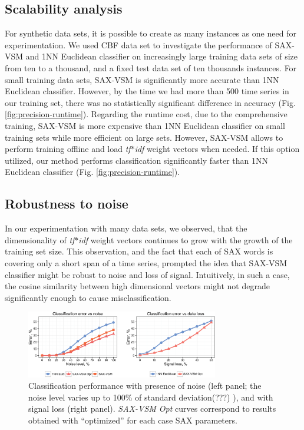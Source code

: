 \documentclass[conference]{IEEEtran}
\newcommand{\myfigureshrinkerless}{\vspace{-0.05cm}}
\begin{document}
\subsection{Scalability analysis}
For synthetic data sets, it is possible to create as many instances as one need for experimentation.
We used CBF data set \cite{cbf} to investigate the performance of SAX-VSM and 1NN Euclidean
classifier on increasingly large training data sets of size from ten to a thousand, and a fixed test
data set of ten thousands instances. For small training data sets, SAX-VSM is significantly more
accurate than 1NN Euclidean classifier. However, by the time we had more than 500 time series in
our training set, there was no statistically significant difference in accuracy (Fig.
\ref{fig:precision-runtime}). 
Regarding the runtime cost, due to the comprehensive training, SAX-VSM is more expensive than 
1NN Euclidean classifier on small training sets while more efficient on large sets.
However, SAX-VSM allows to perform training offline and load \textit{tf$\ast$idf} weight vectors
when
needed. If this option utilized, our method performs classification significantly faster than 
1NN Euclidean classifier (Fig. \ref{fig:precision-runtime}).

\subsection{Robustness to noise}
In our experimentation with many data sets, we observed, that the dimensionality of
\textit{tf$\ast$idf} 
weight vectors continues to grow with the growth of the training set size. 
This observation, and the fact that each of SAX words is covering only a short span of a time 
series, prompted the idea that SAX-VSM classifier might be robust to noise and loss of signal.
Intuitively, in such a case, the cosine similarity between high dimensional 
vectors might not degrade significantly enough to cause misclassification.

\begin{figure}[b]
  \myfigureshrinkerless
  \centering
  \includegraphics[width=84mm]{figures/corrupted.eps}
  \caption{Classification performance with presence of noise
 (left panel; the noise level varies up to 100\% of standard deviation(???) ), and with signal loss
(right panel). \textit{SAX-VSM Opt} curves correspond to 
 results obtained with ``optimized''  for each case SAX parameters.}
  \label{fig:corrupted}
\end{figure}
\end{document}
